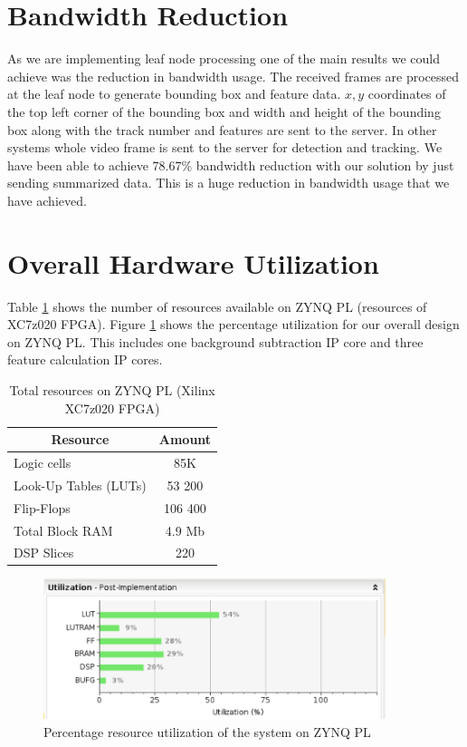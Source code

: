 \documentclass[12pt,a4paper]{report}
\begin{document}
\section{Bandwidth Reduction}
 
As we are implementing leaf node processing one of the main results we could achieve was the reduction in bandwidth usage. The received frames are processed at the leaf node to generate bounding box and feature data. $x,y$ coordinates of the top left corner of the bounding box and width and height of the bounding box along with the track number and features are sent to the server. In other systems whole video frame is sent to the server for detection and tracking.  We have been able to achieve 78.67\% bandwidth reduction with our solution by just sending summarized data. This is a huge reduction in bandwidth usage that we have achieved.

\section{Overall Hardware Utilization}
Table \ref{uti1} shows the number of resources available on ZYNQ PL (resources of XC7z020 FPGA). Figure \ref{util2} shows the percentage utilization for our overall design on ZYNQ PL. This includes one background subtraction IP core and three feature calculation IP cores.
\begin{table}[H]
\centering
\caption{Total resources on ZYNQ PL (Xilinx XC7z020 FPGA)}
\label{uti1}
\begin{tabular}{|l|c|}
\hline
\multicolumn{1}{|c|}{\textbf{Resource}} & \textbf{Amount} \\ \hline
Logic cells                             & 85K             \\ \hline
Look-Up Tables (LUTs)                   & 53 200          \\ \hline
Flip-Flops                              & 106 400         \\ \hline
Total Block RAM                         & 4.9 Mb          \\ \hline
DSP Slices                              & 220             \\ \hline
\end{tabular}
\end{table}


\begin{figure}[H]
\includegraphics[width=10cm]{utilization.png}
\centering
\caption{Percentage resource utilization of the system on ZYNQ PL}
\label{util2}
\end{figure}
\end{document}
